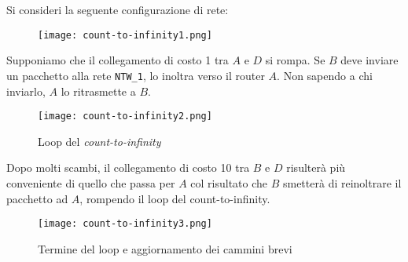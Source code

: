 \begin{eg}
Si consideri la seguente configurazione di rete:

\begin{figure}[h!]
    \centering
    \texttt{[image: count-to-infinity1.png]}
\end{figure}\noindent
Supponiamo che il collegamento di costo 1 tra $A$ e $D$ si rompa. Se $B$ deve
inviare un pacchetto alla rete \texttt{NTW\_1}, lo inoltra verso il
router $A$. Non sapendo a chi inviarlo, $A$ lo ritrasmette a $B$.

\begin{figure}[ht!]
    \centering
    \texttt{[image: count-to-infinity2.png]}
    \caption{Loop del \emph{count-to-infinity}}
\end{figure}\noindent
Dopo molti scambi, il collegamento di costo 10 tra $B$ e $D$ risulterà più
conveniente di quello che passa per $A$ col risultato che $B$ smetterà di
reinoltrare il pacchetto ad $A$, rompendo il loop del count-to-infinity.
\begin{figure}[h!]
    \centering
    \texttt{[image: count-to-infinity3.png]}
    \caption{Termine del loop e aggiornamento dei cammini brevi}
\end{figure}
\end{eg}

